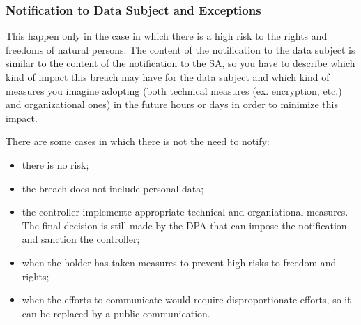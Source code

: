 \subsubsection{Notification to Data Subject and Exceptions}
This happen only in the case in which there is a high risk to the rights and freedoms of natural persons. The content of the notification to the data subject is similar to the content of the notification to the SA, so you have to describe which kind of impact this breach may have for the data subject and which kind of measures you imagine adopting (both technical measures (ex. encryption, etc.) and organizational ones) in the future hours or days in order to minimize this impact.

There are some cases in which there is not the need to notify:
\begin{itemize}
    \item there is no risk;
    \item the breach does not include personal data;
    \item the controller implemente appropriate technical and organiational measures. The final decision is still made by the DPA that can impose the notification and sanction the controller;
    \item when the holder has taken measures to prevent high risks to freedom and rights;
    \item when the efforts to communicate would require disproportionate efforts, so it can be replaced by a public communication.
\end{itemize}

